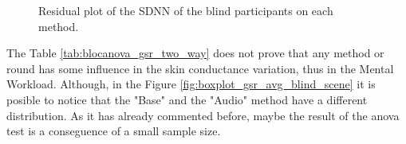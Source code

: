 \begin{figure}[!htb]
\begin{minipage}{0.45\textwidth}
        \caption{Residual plot of the SDNN of the blind participants on each method.}
        \label{fig:residplot_gsr_two_way}
    \end{minipage}
\end{figure}

%

The Table \ref{tab:blocanova_gsr_two_way} does not prove that any method or round has some influence in the skin conductance variation, thus in the Mental Workload. Although, in the Figure \ref{fig:boxplot_gsr_avg_blind_scene} it is posible to notice that the "Base" and the "Audio" method have a different distribution. As it has already commented before, maybe the result of the anova test is a conseguence of a small sample size.

\FloatBarrier

